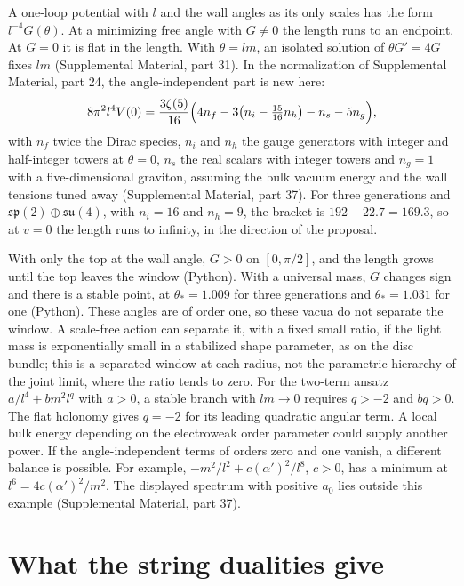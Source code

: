 \documentclass[aps,prd,reprint,onecolumn,nofootinbib,amsmath,amssymb,floatfix]{revtex4-2}
\theoremstyle{plain}
\newcommand{\supp}[1]{Supplemental Material, part #1}
\begin{document}
A one-loop potential with $l$ and the wall angles as its only scales has the form $l^{-4}G(\theta)$. At a minimizing free angle with $G\ne0$ the length runs to an endpoint. At $G=0$ it is flat in the length. With $\theta=lm$, an isolated solution of $\theta G'=4G$ fixes $lm$ (\supp{31}). In the normalization of \supp{24}, the angle-independent part is new here:
\begin{equation}\label{eq:a0}
8\pi^2l^4V(0)=\frac{3\zeta(5)}{16}\Bigl(4n_f-3\bigl(n_i-\tfrac{15}{16}n_h\bigr)-n_s-5n_g\Bigr),
\end{equation}
with $n_f$ twice the Dirac species, $n_i$ and $n_h$ the gauge generators with integer and half-integer towers at $\theta=0$, $n_s$ the real scalars with integer towers and $n_g=1$ with a five-dimensional graviton, assuming the bulk vacuum energy and the wall tensions tuned away (\supp{37}). For three generations and $\mathfrak{sp}(2)\oplus\mathfrak{su}(4)$, with $n_i=16$ and $n_h=9$, the bracket is $192-22.7=169.3$, so at $v=0$ the length runs to infinity, in the direction of the proposal.

With only the top at the wall angle, $G>0$ on $[0,\pi/2]$, and the length grows until the top leaves the window (Python). With a universal mass, $G$ changes sign and there is a stable point, at $\theta_*=1.009$ for three generations and $\theta_*=1.031$ for one (Python). These angles are of order one, so these vacua do not separate the window. A scale-free action can separate it, with a fixed small ratio, if the light mass is exponentially small in a stabilized shape parameter, as on the disc bundle; this is a separated window at each radius, not the parametric hierarchy of the joint limit, where the ratio tends to zero. For the two-term ansatz $a/l^4+b m^2 l^q$ with $a>0$, a stable branch with $lm\to0$ requires $q>-2$ and $bq>0$. The flat holonomy gives $q=-2$ for its leading quadratic angular term. A local bulk energy depending on the electroweak order parameter could supply another power. If the angle-independent terms of orders zero and one vanish, a different balance is possible. For example, $-m^2/l^2+c(\alpha')^2/l^8$, $c>0$, has a minimum at $l^6=4c(\alpha')^2/m^2$. The displayed spectrum with positive $a_0$ lies outside this example (\supp{37}).

\section{What the string dualities give}
\end{document}
